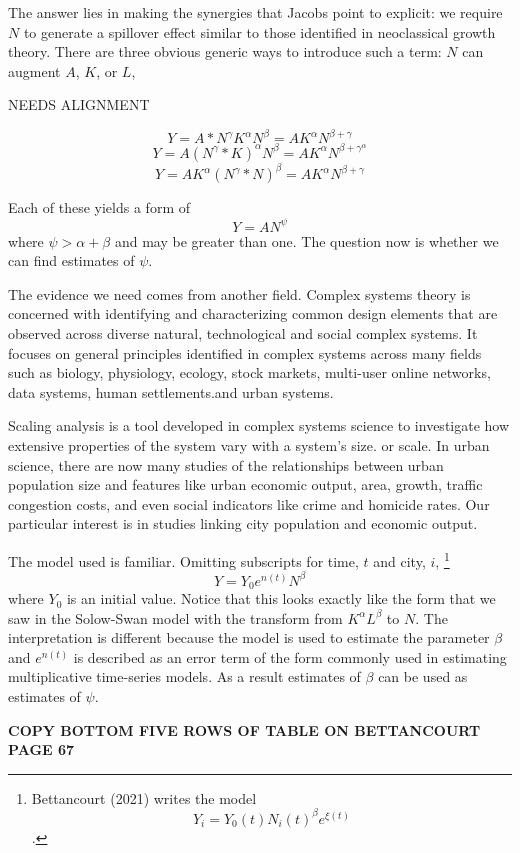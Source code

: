 The answer lies in making the synergies that Jacobs point to explicit: we require $N$ to generate a spillover effect similar to those  identified in neoclassical growth theory. There are three obvious generic ways to introduce such a term: $N$ can augment $A$, $K$, or $L$, 

NEEDS ALIGNMENT
  
\[Y = A*N^\gamma K^\alpha N^\beta= AK^\alpha N^{\beta+\gamma}\]
\[Y = A (N^\gamma* K)^\alpha  N^\beta= AK^\alpha N^{\beta+\gamma^\alpha}\]
\[Y = A K^\alpha (N^\gamma* N)^\beta= AK^\alpha N^{\beta+\gamma}\]

Each of these yields a form of
\[Y = AN^\psi\]
where $\psi> \alpha +\beta$ and may be greater than one. 
The question now is whether we can find estimates of $\psi$.

The evidence we need comes from another field. Complex systems theory is concerned with identifying and characterizing common design elements that are observed across diverse natural, technological and social complex systems. It focuses on general principles  identified in complex systems across many fields such as biology, physiology, ecology, stock markets, multi-user online  networks, data systems, human settlements.and urban systems.

Scaling analysis is a tool developed in complex systems science to investigate how extensive properties of the system vary with a system's size.  or scale.  In urban science, there are now many studies of  the relationships between urban population size and  features like urban economic output,  area, growth, traffic congestion costs, and even social  indicators like crime and homicide rates. Our particular interest is in studies linking city population  and  economic output. 

The model used is familiar. Omitting subscripts for time, $t$ and city, $i$, \footnote{Bettancourt (2021) writes the model \[Y_i = Y_0(t)N_i(t)^\beta e^{\xi(t)}\]. }
\[Y = Y_0e^{n(t)}N^\beta\]
where $Y_0$ is an initial value. Notice that this looks exactly like the form that we saw in the 
Solow-Swan model with the transform from $K^\alpha L^\beta$ to $N$.  The interpretation is different because the model is used to estimate the parameter $\beta$ and $e^{n(t)}$ is described  as an error term of the form commonly used in estimating multiplicative time-series models. As a result estimates of $\beta$  can be used as estimates  of $\psi$.

\vspace{1cm}
\textbf{\Large COPY BOTTOM FIVE ROWS OF TABLE ON BETTANCOURT PAGE 67}  


